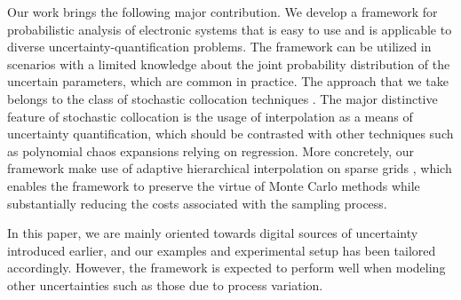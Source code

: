 Our work brings the following major contribution. We develop a framework for
probabilistic analysis of electronic systems that is easy to use and is
applicable to diverse uncertainty-quantification problems. The framework can be
utilized in scenarios with a limited knowledge about the joint probability
distribution of the uncertain parameters, which are common in practice. The
approach that we take belongs to the class of stochastic collocation techniques
\cite{xiu2010}. The major distinctive feature of stochastic collocation is the
usage of interpolation as a means of uncertainty quantification, which should be
contrasted with other techniques such as polynomial chaos expansions relying on
regression. More concretely, our framework make use of adaptive hierarchical
interpolation on sparse grids \cite{klimke2006, ma2009}, which enables the
framework to preserve the virtue of Monte Carlo methods while substantially
reducing the costs associated with the sampling process.

In this paper, we are mainly oriented towards digital sources of uncertainty
introduced earlier, and our examples and experimental setup has been tailored
accordingly. However, the framework is expected to perform well when modeling
other uncertainties such as those due to process variation.
